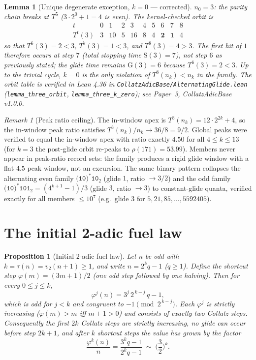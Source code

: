\documentclass[11pt]{article}
\newtheorem{proposition}[theorem]{Proposition}
\newtheorem{lemma}[theorem]{Lemma}
\theoremstyle{remark}
\newtheorem{remark}{Remark}
\newcommand{\T}{T}
\newcommand{\vtwo}{v_2}
\begin{document}
\begin{lemma}[Unique degenerate exception, $k = 0$ --- corrected]
$n_0 = 3$: the parity chain breaks at $\T^5$ ($3\cdot 2^0 + 1 = 4$ is even).
The kernel-checked orbit is
\[
\begin{array}{c|ccccccccc}
  t & 0 & 1 & 2 & 3 & 4 & 5 & 6 & 7 & 8\\ \hline
  \T^t(3) & 3 & 10 & 5 & 16 & 8 & 4 & \mathbf{2} & \mathbf{1} & 4
\end{array}
\]
so that $\T^6(3) = 2 < 3$, $\T^7(3) = 1 < 3$, and $\T^8(3) = 4 > 3$.
The first hit of $1$ therefore occurs at step $7$ (total stopping time
$\mathrm{S}(3) = 7$), not step $6$ as previously stated; the glide time
remains $\mathrm{G}(3) = 6$ because $\T^6(3) = 2 < 3$. Up to the trivial
cycle, $k = 0$ is the only violation of $\T^8(n_k) < n_k$ in the family.
The orbit table is verified in Lean 4.36 in
\texttt{CollatzAdicBase/AlternatingGlide.lean}
(\texttt{lemma\_three\_orbit}, \texttt{lemma\_three\_k\_zero}); see Paper~3,
\emph{CollatzAdicBase} v1.0.0.
\end{lemma}

\begin{remark}[Peak ratio ceiling]
The in-window apex is $\T^3(n_k) = 12\cdot 2^{2k} + 4$, so the in-window
peak ratio satisfies $\T^3(n_k)/n_k \to 36/8 = 9/2$. Global peaks were
verified to equal the in-window apex with ratio exactly $4.50$ for all
$4 \le k \le 13$ (for $k = 3$ the post-glide orbit re-peaks to
$\rho(171) = 53.99$). Members never appear in peak-ratio record sets:
the family produces a rigid glide window with a flat $4.5$ peak window,
not an excursion. The same binary pattern collapses the alternating even
family $\texttt{(10)}^*\texttt{10}_2$ (glide $1$, ratio $\to 3/2$) and the
odd family $\texttt{(10)}^*\texttt{101}_2 = (4^{k+1}-1)/3$ (glide $3$,
ratio $\to 3$) to constant-glide quanta, verified exactly for all
members $\le 10^7$ (e.g.\ glide $3$ for $5, 21, 85, \dots, 5592405$).
\end{remark}

\section{The initial 2-adic fuel law}
\label{sec:fuel}

\begin{proposition}[Initial 2-adic fuel law]
\label{prop:fuel}
Let $n$ be odd with $k = \tau(n) = \vtwo(n+1) \ge 1$, and write
$n = 2^k q - 1$ ($q \ge 1$). Define the \emph{shortcut step}
$\varphi(m) = (3m+1)/2$ (one odd step followed by one halving). Then for
every $0 \le j \le k$,
\[
  \varphi^{j}(n) = 3^{j}\, 2^{\,k-j}\, q - 1,
\]
which is odd for $j < k$ and congruent to $-1 \pmod{2^{\,k-j}}$. Each
$\varphi^{j}$ is strictly increasing ($\varphi(m) > m$ iff $m + 1 > 0$) and
consists of exactly two Collatz steps. Consequently the first $2k$ Collatz
steps are strictly increasing, no glide can occur before step $2k+1$,
and after $k$ shortcut steps the value has grown by the factor
\[
  \frac{\varphi^k(n)}{n} = \frac{3^k q - 1}{2^k q - 1} \;\sim\; \Big(\frac{3}{2}\Big)^{k}.
\]
\end{proposition}
\end{document}
